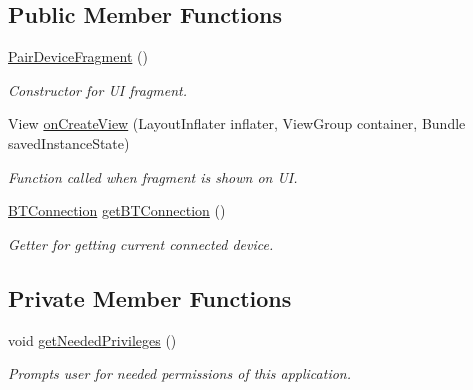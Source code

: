 \subsection*{Public Member Functions}
\begin{DoxyCompactItemize}
\item 
\hyperlink{classcom_1_1jack_1_1motorbikestatistics_1_1_pair_device_fragment_a623b0f81d3d818bd816741bdccad6bd0}{Pair\+Device\+Fragment} ()
\begin{DoxyCompactList}\small\item\em Constructor for UI fragment. \end{DoxyCompactList}\item 
View \hyperlink{classcom_1_1jack_1_1motorbikestatistics_1_1_pair_device_fragment_afc7756a10d0798aa2493b9c7f6b010ad}{on\+Create\+View} (Layout\+Inflater inflater, View\+Group container, Bundle saved\+Instance\+State)
\begin{DoxyCompactList}\small\item\em Function called when fragment is shown on UI. \end{DoxyCompactList}\item 
\hyperlink{classcom_1_1jack_1_1motorbikestatistics_1_1_b_t_connection}{B\+T\+Connection} \hyperlink{classcom_1_1jack_1_1motorbikestatistics_1_1_pair_device_fragment_a32debe1358d94bb1c972137f60d1aa36}{get\+B\+T\+Connection} ()
\begin{DoxyCompactList}\small\item\em Getter for getting current connected device. \end{DoxyCompactList}\end{DoxyCompactItemize}
\subsection*{Private Member Functions}
\begin{DoxyCompactItemize}
\item 
void \hyperlink{classcom_1_1jack_1_1motorbikestatistics_1_1_pair_device_fragment_a5be2be0c93319e38e39cf23943ab1c8c}{get\+Needed\+Privileges} ()
\begin{DoxyCompactList}\small\item\em Prompts user for needed permissions of this application. \end{DoxyCompactList}\end{DoxyCompactItemize}
